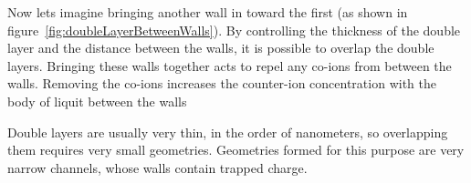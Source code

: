 


    Now lets imagine bringing another wall in toward the first (as shown in figure~\ref{fig:doubleLayerBetweenWalls}).
    By controlling the thickness of the double layer and the distance between the walls, it is possible to overlap the double layers.
    Bringing these walls together acts to repel any co-ions from between the walls.
    Removing the co-ions increases the counter-ion concentration with the body of liquit between the walls

    Double layers are usually very thin, in the order of nanometers, so overlapping them requires very small geometries.
    Geometries formed for this purpose are very narrow channels, whose walls contain trapped charge.

    


    






